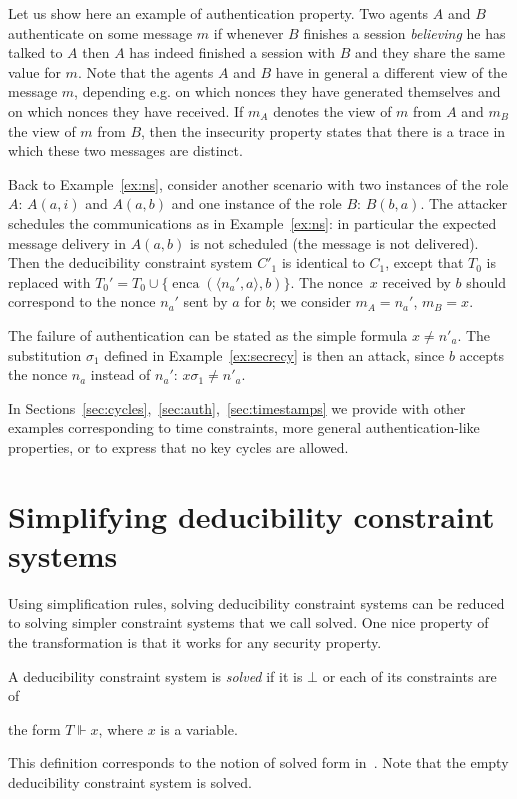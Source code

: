 \documentclass[acmtocl,acmnow]{acmtrans2m}
\newcommand{\pair}[2]{\langle{#1},{#2}\rangle}
\newcommand{\enca}{\operatorname{enca}}
\newcommand{\pub}[1]{#1}
\newcommand{\dedsys}[1]{deducibility constraint system}
\newcommand{\dedsyss}[1]{deducibility constraint systems}
\begin{document}
\begin{example}\label{ex:auth}
Let us show here an example of authentication property.
Two agents $A$ and $B$ authenticate on some message $m$ if whenever
$B$ finishes a session \emph{believing} he has talked to $A$ then $A$
has indeed finished a session with $B$ and they share the same value
for $m$. Note that the agents $A$ and $B$ have in general a different
view of the message $m$, depending e.g. on which nonces they have generated
themselves and on which nonces they have received.
If $m_A$ denotes the view of $m$ from $A$ and $m_B$ the view of $m$
from $B$, then the insecurity property states that there is a trace in which
these two messages are distinct. 


Back to Example~\ref{ex:ns}, consider another scenario with two instances
of the role $A$: $A(a,i)$ and $A(a,b)$ and one instance of the role $B$:
$B(b,a)$. The attacker schedules the communications as in Example~\ref{ex:ns}: in particular the expected message delivery in $A(a,b)$ is
not scheduled (the message is not delivered). Then the \dedsys{}
$C'_1$ is identical to $C_1$, except that $T_0$ is replaced with
$T_0'=T_0\cup\{\enca(\pair{n_a'}{a},\pub{b})\}$. The nonce~$x$ received by $b$ should correspond to the nonce $n_a'$
sent by $a$ for $b$; we consider $m_A = n_a'$, $m_B = x$. 


The failure of authentication can be stated as the simple formula $x \neq n'_a$.
The substitution $\sigma_1$ defined in Example~\ref{ex:secrecy} is then
an attack,
since $b$ accepts the nonce $n_a$ instead of $n_a'$: $x\sigma_1\neq n'_a$. 
\end{example}


In Sections~\ref{sec:cycles},~\ref{sec:auth},~\ref{sec:timestamps} we provide with other examples 
corresponding to time constraints, more general authentication-like
properties, or to express that no key
cycles are allowed.

\section{Simplifying \dedsyss{}}\label{sec:approach}
Using simplification rules, solving \dedsyss{} can be reduced to solving simpler
constraint systems that we call solved.
One nice property of the transformation is that it works for any
security property.

\begin{definition}
A \dedsys{} is \emph{solved} if it is
 $\bot$ or each of its constraints are of

the form $T\Vdash x$, where $x$ is a variable.
\end{definition}
This definition corresponds to the notion of solved form in~\cite{CS03}.
Note that the empty \dedsys{} is solved. 
\end{document}

